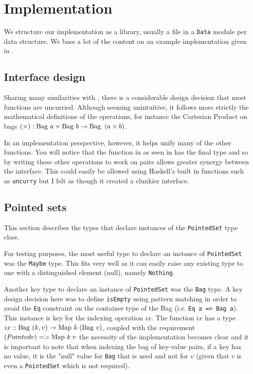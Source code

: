 \section{Implementation}
We structure our implementation as a library, usually a file in a \texttt{Data}
module per data structure. We base a lot of the content on an example
implementation given in
\cite{RelationalAlgebraByWayOfAdjunctionsPrototypeImplementation}.

\subsection{Interface design}
Sharing many similarities with \cite{RelationalAlgebraByWayOfAdjunctions}, there
is a considerable design decision that most functions are uncurried. Although
seeming unintuitive, it follows more strictly the mathematical definitions of
the operations, for instance the Cartesian Product on bags $(\times): \mathrm{Bag}\ a
\times \mathrm{Bag}\ b \to \mathrm{Bag}\ \left(a \times b\right)$.

In an implementation perspective, however, it helps unify many of the other
functions. You will notice that the  function in
\cite{RelationalAlgebraByWayOfAdjunctions} as seen in 
 has the final type  and so by writing these other operations to work on pairs allows
greater synergy between the interface. This could easily be allowed using
Haskell's built in functions\cite{Prelude} such as \texttt{uncurry} but I felt
as though it created a clunkier interface.

\subsection{Pointed sets}
This section describes the types that declare instances of the
\texttt{PointedSet} type class.

For testing purposes, the most useful type to declare an instance of
\texttt{PointedSet} was the \texttt{Maybe} type. This fits very well as it can
easily raise any existing type to one with a distinguished element (null),
namely \texttt{Nothing}.

Another key type to declare an instance of \texttt{PointedSet} was the
\texttt{Bag} type. A key design decision here was to define \texttt{isEmpty}
using pattern matching in order to avoid the \texttt{Eq} constraint on the
container type of the Bag (i.e. \texttt{Eq a => Bag a}). This instance is key
for the indexing operation $ix$. The function $ix$ has a type $ix ::
\mathrm{Bag}\ (k, v) \to \mathrm{Map}\ k\;(\mathrm{Bag}\ v)$, coupled with the requirement $(Pointed v)
=> \mathrm{Map}\ k\;v$ the necessity of the implementation becomes clear and it is
important to note that when indexing the bag of key-value pairs, if a key has no
value, it is the "null" value for \texttt{Bag} that is used and not for $v$
(given that $v$ is even a \texttt{PointedSet} which is not required).

